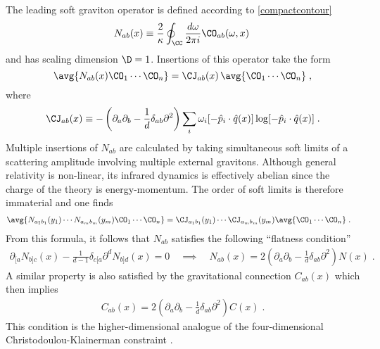 \documentclass[11pt]{article}
\def\d{{\delta}}
\def\o{{\omega}}
\def\p{{\partial}}
\begin{document}
The leading soft graviton operator is defined according to \eqref{compactcontour}
\begin{equation}
\begin{split}
N_{ab}(x) \equiv \frac{2}{\kappa} \oint_\CC \frac{d\o}{2\pi i} \CO_{ab}(\o,x) \;  
\end{split}
\end{equation}
 and has scaling dimension $\D=1$. Insertions of this operator take the form
\begin{equation}
\avg{ N_{ab}(x) \CO_1 \cdots \CO_n }  =  \CJ_{ab}(x)\, \avg{ \CO_1 \cdots \CO_n } \; ,  
\end{equation}
where
\begin{equation}
\begin{split}\label{Jabdef}
\CJ_{ab}(x) &\equiv - \left( \p_a \p_b - \frac{1}{d} \d_{ab} \p^2 \right) \sum_i \o_i [ - {\hat p}_i \cdot {\hat q}(x) ]  \log [ - {\hat p}_i \cdot {\hat q}(x) ] \;  .\\
\end{split}
\end{equation}
Multiple insertions of $N_{ab}$ are calculated by taking simultaneous soft limits of a scattering amplitude involving multiple external gravitons. Although general relativity is non-linear, its infrared dynamics is effectively abelian since the charge of the theory is energy-momentum. The order of soft limits is therefore immaterial and one finds
\begin{equation}
\begin{split}
&\avg{N_{a_1b_1}(y_1) \cdots N_{a_mb_m}(y_m) \CO_1 \cdots \CO_n } = \CJ_{a_1 b_1} ( y_1 ) \cdots \CJ_{a_m b_m} ( y_m ) \avg{ \CO_1 \cdots \CO_n } \;  .
\end{split}
\end{equation}
From this formula, it follows that $N_{ab}$ satisfies the following ``flatness condition''
\begin{equation}
\begin{split}
\p_{[a} N_{b]c} (x) - \frac{1}{d-1} \d_{c[a} \p^d N_{b]d} (x)  = 0 \quad \implies \quad N_{ab}(x) = 2 \left( \p_a \p_b - \frac{1}{d} \d_{ab} \p^2 \right)N(x) \;  .
\end{split}
\end{equation}
A similar property is also satisfied by the gravitational connection $C_{ab}(x)$ which then implies
\begin{equation}
\begin{split}
C_{ab}(x) = 2 \left( \p_a \p_b - \frac{1}{d} \d_{ab} \p^2 \right) C(x) \; . 
\end{split}
\end{equation}
This condition is the higher-dimensional analogue of the four-dimensional Christodoulou-Klainerman constraint \cite{Strominger:2013jfa}.
\end{document}
